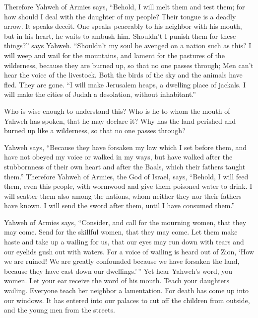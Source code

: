  Therefore Yahweh of Armies says, ``Behold, I will melt them
and test them; for how should I deal with the daughter of my people?
 Their tongue is a deadly arrow. It speaks deceit. One
speaks peaceably to his neighbor with his mouth, but in his heart, he
waits to ambush him.  Shouldn't I punish them for these
things?'' says Yahweh. ``Shouldn't my soul be avenged on a nation such
as this?  I will weep and wail for the mountains, and
lament for the pastures of the wilderness, because they are burned up,
so that no one passes through; Men can't hear the voice of the
livestock. Both the birds of the sky and the animals have fled. They are
gone.  ``I will make Jerusalem heaps, a dwelling place of
jackals. I will make the cities of Judah a desolation, without
inhabitant.''

 Who is wise enough to understand this? Who is he to whom
the mouth of Yahweh has spoken, that he may declare it? Why has the land
perished and burned up like a wilderness, so that no one passes through?

 Yahweh says, ``Because they have forsaken my law which I
set before them, and have not obeyed my voice or walked in my ways,
 but have walked after the stubbornness of their own heart
and after the Baals, which their fathers taught them.'' 
Therefore Yahweh of Armies, the God of Israel, says, ``Behold, I will
feed them, even this people, with wormwood and give them poisoned water
to drink.  I will scatter them also among the nations, whom
neither they nor their fathers have known. I will send the sword after
them, until I have consumed them.''

 Yahweh of Armies says, ``Consider, and call for the
mourning women, that they may come. Send for the skillful women, that
they may come.  Let them make haste and take up a wailing
for us, that our eyes may run down with tears and our eyelids gush out
with waters.  For a voice of wailing is heard out of Zion,
`How we are ruined! We are greatly confounded because we have forsaken
the land, because they have cast down our dwellings.'\,'' 
Yet hear Yahweh's word, you women. Let your ear receive the word of his
mouth. Teach your daughters wailing. Everyone teach her neighbor a
lamentation.  For death has come up into our windows. It
has entered into our palaces to cut off the children from outside, and
the young men from the streets.

